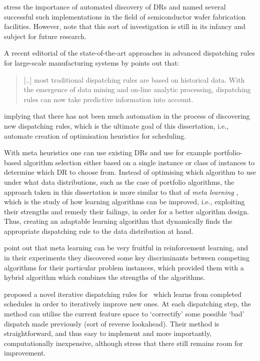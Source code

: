 \citet{Monch13} stress the importance of automated discovery of DRs and named 
several successful such implementations in the field of semiconductor wafer 
fabrication facilities. 
However, \citeauthor{Monch13} note that this sort of investigation is still in 
its infancy and subject for future research.

A recent editorial of the state-of-the-art approaches in advanced dispatching 
rules for large-scale manufacturing systems by \citet{Chen13} points out that:
\begin{quote}
    [..] most traditional dispatching rules are based on historical data. With 
    the emergence of data mining and on-line analytic processing, dispatching 
    rules can now take predictive information into account.
\end{quote}
implying that there has not been much automation in the process of discovering 
new dispatching rules, which is the ultimate goal of this dissertation, i.e., 
automate creation of optimisation heuristics for scheduling. 

With meta heuristics one can use existing DRs and use for example 
{portfolio-based algorithm selection} either based 
on a single instance \citep{Rice76,Gomes01} or class of instances \citep{Xu07} 
to determine which DR to choose from. 
Instead of optimising which algorithm to use under what data distributions, 
such as the case of portfolio algorithms, the approach taken in this 
dissertation is more similar to that of \emph{meta learning} \citep{Vilalta02}, 
which is the study of how learning algorithms can be improved, i.e., exploiting 
their strengths and remedy their failings, in order for a better algorithm 
design. Thus, creating an adaptable learning algorithm that dynamically finds 
the appropriate dispatching rule  to the data distribution at hand. 

\citet{Kalyanakrishnan11} point out that meta learning can be very fruitful in 
reinforcement learning, and in their experiments they discovered some key 
discriminants between competing algorithms for their particular problem 
instances, which provided them with a hybrid algorithm which combines the 
strengths of the algorithms.

\citet{Nguyen13} proposed a novel {iterative dispatching rules} for \JSP\ 
which learns from completed schedules in order to iteratively improve new ones. 
At each dispatching step, the method can utilise the current feature space to 
`correctify' some possible `bad' dispatch made previously (sort of reverse 
lookahead). Their method is straightforward, and thus easy to implement and 
more importantly, computationally inexpensive, although \citeauthor{Nguyen13} 
stress that there still remains room for improvement. 

